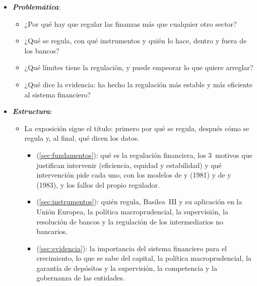 \documentclass[11pt]{article}
\begin{document}
\begin{itemize}
\begin{itemize}
\begin{itemize}
    \item \emph{La crisis de 2007-2009}: la respuesta fue, por primera vez, global. El G-20 creó en 2009 el Consejo de Estabilidad Financiera (FSB) y encargó Basilea~III; Estados Unidos aprobó la Ley Dodd-Frank en 2010, y la Unión Europea, el Sistema Europeo de Supervisión Financiera en 2011 y la unión bancaria desde 2014\nocite{FSB2026Historia,G20Londres2009}.
    \item \emph{Los años 20~de este siglo}: la covid-19, la caída de Silicon Valley Bank y de Credit Suisse en 2023, el peso creciente de la intermediación no bancaria y los criptoactivos abren una nueva etapa.
    \end{itemize}
  \end{itemize}

\item \textbf{\emph{Problemática}}:
  \begin{itemize}
  \item ¿Por qué hay que regular las finanzas más que cualquier otro sector?
  \item ¿Qué se regula, con qué instrumentos y quién lo hace, dentro y fuera de los bancos?
  \item ¿Qué límites tiene la regulación, y puede empeorar lo que quiere arreglar?
  \item ¿Qué dice la evidencia: ha hecho la regulación más estable y más eficiente al sistema financiero?
  \end{itemize}

\item \textbf{\emph{Estructura}}:
  \begin{itemize}
  \item La exposición sigue el título: primero por qué se regula, después cómo se regula y, al final, qué dicen los datos.
    \begin{itemize}
    \item {} (\ref{sec:fundamentos}): qué es la regulación financiera, los 3~motivos que justifican intervenir (eficiencia, equidad y estabilidad) y qué intervención pide cada uno, con los modelos de  y  (1981) y de  y  (1983), y los fallos del propio regulador.
    \item {} (\ref{sec:instrumentos}): quién regula, Basilea~III y su aplicación en la Unión Europea, la política macroprudencial, la supervisión, la resolución de bancos y la regulación de los intermediarios no bancarios.
    \item {} (\ref{sec:evidencia}): la importancia del sistema financiero para el crecimiento, lo que se sabe del capital, la política macroprudencial, la garantía de depósitos y la supervisión, la competencia y la gobernanza de las entidades.
    \end{itemize}
  \end{itemize}
\end{itemize}
\end{document}
